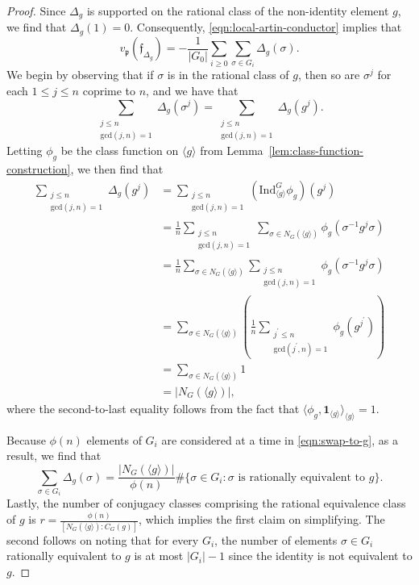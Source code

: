 \documentclass[12pt]{amsart}
\theoremstyle{definition} \newtheorem{definition}[theorem]{Definition}
\theoremstyle{example} \newtheorem{example}[theorem]{Example}
\theoremstyle{remark} \newtheorem{remark}{Remark}[theorem]
\numberwithin{equation}{section}
\numberwithin{theorem}{section}
\renewcommand{\leq}{\leqslant}
\renewcommand{\geq}{\geqslant}
\begin{document}
	\begin{proof}
		Since $\Delta_g$ is supported on the rational class of the non-identity element $g$, we find that $\Delta_g(1) = 0$.  Consequently, \eqref{eqn:local-artin-conductor} implies that
			\[
				v_\mathfrak{p}(\mathfrak{f}_{\Delta_g})
					= -\frac{1}{|G_0|} \sum_{i \geq 0} \sum_{\sigma \in G_i} \Delta_g(\sigma).
			\]
		We begin by observing that if $\sigma$ is in the rational class of $g$, then so are $\sigma^j$ for each $1 \leq j \leq n$ coprime to $n$, and we have that
			\begin{equation} \label{eqn:swap-to-g}
				\sum_{\substack{ j \leq n \\ \mathrm{gcd}(j,n) = 1}} \Delta_g(\sigma^j)
					= \sum_{\substack{ j \leq n \\ \mathrm{gcd}(j,n) = 1}} \Delta_g(g^j).
			\end{equation}
		Letting $\phi_g$ be the class function on $\langle g \rangle$ from Lemma~\ref{lem:class-function-construction}, we then find that
			\begin{align*}
				\sum_{\substack{ j \leq n \\ \mathrm{gcd}(j,n) = 1}} \Delta_g(g^j)
					& = \sum_{\substack{ j \leq n \\ \mathrm{gcd}(j,n) = 1}} \left(\mathrm{Ind}_{\langle g \rangle}^G \phi_g\right)(g^j) \\
					& = \frac{1}{n} \sum_{\substack{ j \leq n \\ \mathrm{gcd}(j,n) = 1}} \sum_{\sigma \in N_G(\langle g \rangle)} \phi_g(\sigma^{-1}g^j\sigma) \\
					& = \frac{1}{n} \sum_{\sigma \in N_G(\langle g \rangle)} \sum_{\substack{ j \leq n \\ \mathrm{gcd}(j,n) = 1}} \phi_g( \sigma^{-1} g^j \sigma) \\
					& = \sum_{\sigma \in N_G(\langle g \rangle)} \left( \frac{1}{n} \sum_{\substack{ j^\prime \leq n \\ \mathrm{gcd}(j^\prime,n) = 1}} \phi_g( g^{j^\prime} )\right) \\
					& = \sum_{\sigma \in N_G(\langle g \rangle)} 1 \\
					& = |N_G(\langle g \rangle)|,
			\end{align*}
		where the second-to-last equality follows from the fact that $\langle \phi_g, \mathbf{1}_{\langle g \rangle}\rangle_{\langle g \rangle} = 1$.  
		
		Because $\phi(n)$ elements of $G_i$ are considered at a time in \eqref{eqn:swap-to-g}, as a result, we find that 
			\[
				\sum_{\sigma \in G_i} \Delta_g(\sigma)
					= \frac{|N_G(\langle g \rangle)|}{\phi(n)} \#\{ \sigma \in G_i : \sigma \text{ is rationally equivalent to $g$}\}.
			\]
		Lastly, the number of conjugacy classes comprising the rational equivalence class of $g$ is $r = \frac{\phi(n)}{[N_G(\langle g \rangle) : C_G(g)]}$, which implies the first claim on simplifying.  The second follows on noting that for every $G_i$, the number of elements $\sigma \in G_i$ rationally equivalent to $g$ is at most $|G_i|-1$ since the identity is not equivalent to $g$.
	\end{proof}
\end{document}
